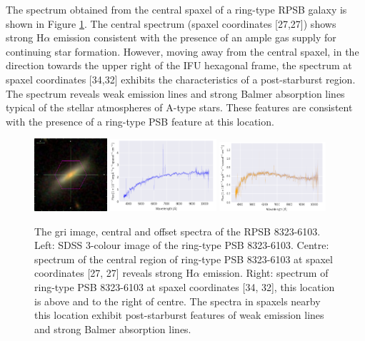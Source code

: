 The spectrum obtained from the central spaxel of a ring-type RPSB galaxy is shown in Figure \ref{fig:RPSB-8323-6103-spec}. The central spectrum (spaxel coordinates [27,27]) shows strong H$\alpha$ emission consistent with the presence of an ample gas supply for continuing star formation. However, moving away from the central spaxel, in the direction towards the upper right of the IFU hexagonal frame, the spectrum at spaxel coordinates [34,32] exhibits the characteristics of a post-starburst region. The spectrum reveals weak emission lines and strong Balmer absorption lines typical of the stellar atmospheres of A-type stars. These features are consistent with the presence of a ring-type PSB feature at this location.

\begin{figure}
    \centering
    \includegraphics[width=0.24\textwidth]{images/Cutouts/RPSB-8323-6103-IM.png}
    \hfill
    \includegraphics[width=0.35\textwidth]{images/Spectra/RPSB-8323-6103-27-27.png}
    \hfill
    \includegraphics[width=0.35\textwidth]{images/Spectra/RPSB-8323-6103-34-32.png}
    \caption[Image and central and offset spectra of the RPSB 8323-6103]{The gri image, central and offset spectra of the RPSB 8323-6103. Left: SDSS 3-colour image of the ring-type PSB 8323-6103. 
    Centre: spectrum of the central region of ring-type PSB 8323-6103 at spaxel coordinates [27, 27] reveals strong H$\alpha$ emission. 
    Right: spectrum of ring-type PSB 8323-6103 at spaxel coordinates [34, 32], this location is above and to the right of centre. The spectra in spaxels nearby this location exhibit post-starburst features of weak emission lines and strong Balmer absorption lines.}
    \label{fig:RPSB-8323-6103-spec}
\end{figure}

